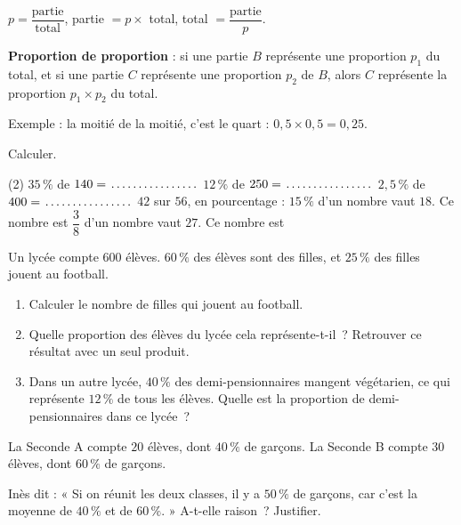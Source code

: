 \documentclass[a4paper,11pt,fleqn]{article}
\newcommand{\pt}[1][1.6cm]{\makebox[#1]{\dotfill}}
\newcommand{\ligne}{\par\smallskip\makebox[\linewidth]{\dotfill}\par}
\begin{document}


\begin{tcolorbox}[colback=white, colframe=couleur_theme, title=\textbf{Rappel}, fonttitle=\bfseries]
$p = \dfrac{\text{partie}}{\text{total}}$, \qquad partie $= p \times$ total, \qquad total $= \dfrac{\text{partie}}{p}$.

\smallskip
\textbf{Proportion de proportion} : si une partie $B$ représente une proportion $p_1$ du total, et si une partie $C$ représente une proportion $p_2$ de $B$, alors $C$ représente la proportion $p_1 \times p_2$ du total.

Exemple : la moitié de la moitié, c'est le quart : \quad $0{,}5 \times 0{,}5 = 0{,}25$.
\end{tcolorbox}

\begin{EXO}{}{}
Calculer.

\begin{tasks}[label=\textbf{\alph*.}, item-indent=2em, after-item-skip=0.9em](2)
	\task $35\,\%$ de $140 = \pt[2.5cm]$
	\task $12\,\%$ de $250 = \pt[2.5cm]$
	\task $2{,}5\,\%$ de $400 = \pt[2.5cm]$
	\task $42$ sur $56$, en pourcentage : \pt[2cm]
	\task* $15\,\%$ d'un nombre vaut $18$. Ce nombre est \pt[1.5cm]
	\task* $\dfrac{3}{8}$ d'un nombre vaut $27$. Ce nombre est \pt[1.5cm]
\end{tasks}
\end{EXO}

\begin{EXO}{}{}
Un lycée compte $600$ élèves. $60\,\%$ des élèves sont des filles, et $25\,\%$ des filles jouent au football.
\begin{enumerate}[itemsep=0.3em]
	\item Calculer le nombre de filles qui jouent au football.
	\ligne
	\item Quelle proportion des élèves du lycée cela représente-t-il~? Retrouver ce résultat avec un seul produit.
	\ligne
	\item Dans un autre lycée, $40\,\%$ des demi-pensionnaires mangent végétarien, ce qui représente $12\,\%$ de tous les élèves. Quelle est la proportion de demi-pensionnaires dans ce lycée~?
	\ligne\ligne
\end{enumerate}
\end{EXO}

\begin{EXO}{}{}
La Seconde A compte $20$ élèves, dont $40\,\%$ de garçons. La Seconde B compte $30$ élèves, dont $60\,\%$ de garçons.

Inès dit : « Si on réunit les deux classes, il y a $50\,\%$ de garçons, car c'est la moyenne de $40\,\%$ et de $60\,\%$. » A-t-elle raison~? Justifier.
\ligne\ligne\ligne
\end{EXO}
\end{document}
